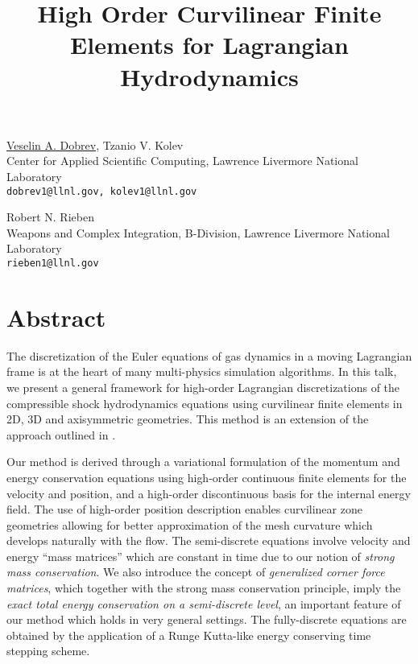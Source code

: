 \title{High Order Curvilinear Finite Elements for Lagrangian Hydrodynamics}
\author{} \institute{}
\maketitle

\begin{center}
{\large \underline{Veselin A. Dobrev}, Tzanio V. Kolev}\\
Center for Applied Scientific Computing, Lawrence Livermore National Laboratory\\
{\tt dobrev1@llnl.gov, kolev1@llnl.gov}\\
\vspace{4mm}

{\large Robert N. Rieben}\\
Weapons and Complex Integration, B-Division, Lawrence Livermore National Laboratory\\
{\tt rieben1@llnl.gov}
\end{center}

\section*{Abstract}
The discretization of the Euler equations of gas dynamics in a moving Lagrangian frame is at the heart of many multi-physics simulation algorithms. In this talk,
we present a general framework for high-order Lagrangian discretizations of the compressible shock hydrodynamics equations using curvilinear finite elements in
2D, 3D and axisymmetric geometries. This method is an extension of the approach outlined in \cite{DobrevEllisKolevRieben10}.

Our method is derived through a variational formulation of the momentum and energy conservation equations using high-order continuous finite elements for the velocity and position, and a high-order discontinuous basis for the internal energy field. The use of high-order position description enables curvilinear zone geometries allowing for better approximation of the mesh curvature which develops naturally with the flow. The semi-discrete equations involve velocity and energy ``mass matrices'' which are constant in time due to our notion of {\em strong mass conservation}. We also introduce the concept of {\em generalized corner force matrices}, which together with the strong mass conservation principle, imply the {\em exact total energy conservation on a semi-discrete level}, an important feature of our method which holds in very general settings. The fully-discrete equations are obtained by the application of a Runge Kutta-like energy conserving time stepping scheme.

